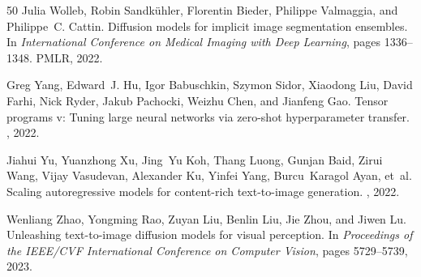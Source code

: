 \documentclass[manuscript,screen,review]{acmart}
\begin{document}
\begin{thebibliography}{50}
Julia Wolleb, Robin Sandk{\"u}hler, Florentin Bieder, Philippe Valmaggia, and Philippe~C. Cattin.
\newblock Diffusion models for implicit image segmentation ensembles.
\newblock In {\em International Conference on Medical Imaging with Deep Learning}, pages 1336--1348. PMLR, 2022.

Greg Yang, Edward~J. Hu, Igor Babuschkin, Szymon Sidor, Xiaodong Liu, David Farhi, Nick Ryder, Jakub Pachocki, Weizhu Chen, and Jianfeng Gao.
\newblock Tensor programs v: Tuning large neural networks via zero-shot hyperparameter transfer.
, 2022.

Jiahui Yu, Yuanzhong Xu, Jing~Yu Koh, Thang Luong, Gunjan Baid, Zirui Wang, Vijay Vasudevan, Alexander Ku, Yinfei Yang, Burcu~Karagol Ayan, et~al.
\newblock Scaling autoregressive models for content-rich text-to-image generation.
, 2022.

Wenliang Zhao, Yongming Rao, Zuyan Liu, Benlin Liu, Jie Zhou, and Jiwen Lu.
\newblock Unleashing text-to-image diffusion models for visual perception.
\newblock In {\em Proceedings of the IEEE/CVF International Conference on Computer Vision}, pages 5729--5739, 2023.

\end{thebibliography}
\end{document}
